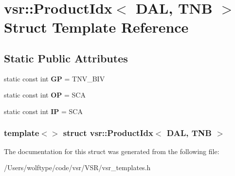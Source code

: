 \hypertarget{structvsr_1_1_product_idx_3_01_d_a_l_00_01_t_n_b_01_4}{\section{vsr\-:\-:Product\-Idx$<$ D\-A\-L, T\-N\-B $>$ Struct Template Reference}
\label{structvsr_1_1_product_idx_3_01_d_a_l_00_01_t_n_b_01_4}
}
\subsection*{Static Public Attributes}
\begin{DoxyCompactItemize}
\item 
\hypertarget{structvsr_1_1_product_idx_3_01_d_a_l_00_01_t_n_b_01_4_ae0c567fe20775a7b77d1043e76619d50}{static const int {\bfseries G\-P} = T\-N\-V\-\_\-\-B\-I\-V}\label{structvsr_1_1_product_idx_3_01_d_a_l_00_01_t_n_b_01_4_ae0c567fe20775a7b77d1043e76619d50}

\item 
\hypertarget{structvsr_1_1_product_idx_3_01_d_a_l_00_01_t_n_b_01_4_a519710ba394f53b9fa53ec4744a23a9c}{static const int {\bfseries O\-P} = S\-C\-A}\label{structvsr_1_1_product_idx_3_01_d_a_l_00_01_t_n_b_01_4_a519710ba394f53b9fa53ec4744a23a9c}

\item 
\hypertarget{structvsr_1_1_product_idx_3_01_d_a_l_00_01_t_n_b_01_4_afcad9f742439861774712a7f43b83602}{static const int {\bfseries I\-P} = S\-C\-A}\label{structvsr_1_1_product_idx_3_01_d_a_l_00_01_t_n_b_01_4_afcad9f742439861774712a7f43b83602}

\end{DoxyCompactItemize}
\subsubsection*{template$<$$>$ struct vsr\-::\-Product\-Idx$<$ D\-A\-L, T\-N\-B $>$}



The documentation for this struct was generated from the following file\-:\begin{DoxyCompactItemize}
\item 
/\-Users/wolftype/code/vsr/\-V\-S\-R/vsr\-\_\-templates.\-h\end{DoxyCompactItemize}
